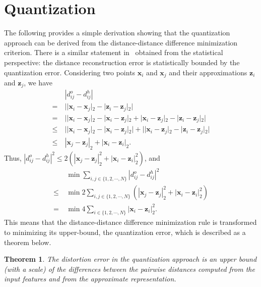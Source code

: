 \documentclass[10pt,journal,compsoc]{IEEEtran}
\begin{document}
\section{Quantization}
\label{sec:quantization}

The following provides a simple derivation
showing that
the quantization approach can be derived
from the distance-distance difference minimization criterion.
There is a similar statement in~\cite{JegouDS11}
obtained from the statistical perspective:
the distance reconstruction error is statistically bounded
by the quantization error.
Considering two points $\mathbf{x}_i$ and $\mathbf{x}_j$
and their approximations $\mathbf{z}_i$ and $\mathbf{z}_j$,
we have
\begin{align}
&~ |d^o_{ij} - d^h_{ij}|  \\
=&~ | |\mathbf{x}_i - \mathbf{x}_j|_2 - |\mathbf{z}_i - \mathbf{z}_j|_2 | \\
=&~ | |\mathbf{x}_i - \mathbf{x}_j|_2 - |\mathbf{x}_i - \mathbf{z}_j|_2 + |\mathbf{x}_i - \mathbf{z}_j|_2 - |\mathbf{z}_i - \mathbf{z}_j|_2 | \\
\leqslant &~ | |\mathbf{x}_i - \mathbf{x}_j|_2 - |\mathbf{x}_i - \mathbf{z}_j|_2 | + | |\mathbf{x}_i - \mathbf{z}_j|_2 - |\mathbf{z}_i - \mathbf{z}_j|_2 | \\
\leqslant &~ |\mathbf{x}_j - \mathbf{z}_j|_2 + |\mathbf{x}_i - \mathbf{z}_i|_2.
\end{align}
Thus, $|d^o_{ij} - d^h_{ij}|^2 \leqslant 2 (|\mathbf{x}_j - \mathbf{z}_j|^2_2 + |\mathbf{x}_i - \mathbf{z}_i|^2_2)$,
and
\begin{align}
&\min \sum\nolimits_{i, j \in \{1, 2, \cdots, N \} } |d^o_{ij} - d^h_{ij}|^2 \\
\leqslant ~& \min 2\sum\nolimits_{i, j \in \{1, 2, \cdots, N\} } (|\mathbf{x}_j - \mathbf{z}_j|^2_2 + |\mathbf{x}_i - \mathbf{z}_i|^2_2) \\
=~& \min 4\sum\nolimits_{i \in \{1, 2, \cdots, N\} }|\mathbf{x}_i - \mathbf{z}_i|^2_2.
\end{align}
This means that
the distance-distance difference minimization rule is transformed
to minimizing its upper-bound,
the quantization error,
which is described as a theorem below.

\newtheorem{Theorem}{Theorem}
\newcommand{\TheoremRef}[1]{Theorem.~#1}

\begin{Theorem}
\label{theorem1}
The distortion error
in the quantization approach
is an upper bound (with a scale)
of the differences
between the pairwise distances
computed from the input features
and from the approximate representation.
\end{Theorem}
\end{document}
